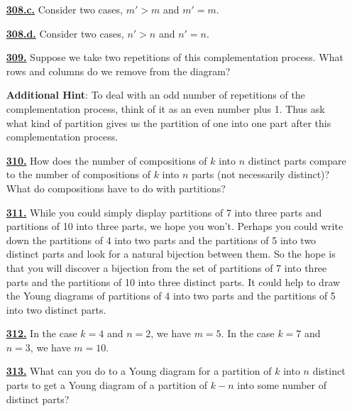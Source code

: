 \documentclass[10pt,]{book}
\theoremstyle{plain}
\theoremstyle{definition}
\theoremstyle{definition}
\theoremstyle{definition}
\numberwithin{equation}{chapter}
\newcommand{\gt}{>}
\begin{document}
\begin{itemize}[itemsep=1em]
\hypertarget{a-308.c}{}\item[\textbf{\hyperref[task-267]{308.c.}}]
\hypertarget{p-1525}{}%
Consider two cases, \(m' \gt m\) and \(m' = m\).%

\hypertarget{a-308.d}{}\item[\textbf{\hyperref[task-268]{308.d.}}]
\hypertarget{p-1528}{}%
Consider two cases, \(n' \gt n\) and \(n' = n\).%

\hypertarget{a-309}{}\item[\textbf{\hyperref[activity-302]{309.}}]
\hypertarget{p-1535}{}%
Suppose we take two repetitions of this complementation process. What rows and columns do we remove from the diagram?%

\par\smallskip
\noindent\textbf{Additional Hint}: \hypertarget{p-1536}{}%
To deal with an odd number of repetitions of the complementation process, think of it as an even number plus 1. Thus ask what kind of partition gives us the partition of one into one part after this complementation process.%

\hypertarget{a-310}{}\item[\textbf{\hyperref[activity-303]{310.}}]
\hypertarget{p-1543}{}%
How does the number of compositions of \(k\) into \(n\) distinct parts compare to the number of compositions of \(k\) into \(n\) parts (not necessarily distinct)? What do compositions have to do with partitions?%

\hypertarget{a-311}{}\item[\textbf{\hyperref[activity-304]{311.}}]
\hypertarget{p-1546}{}%
While you could simply display partitions of 7 into three parts and partitions of 10 into three parts, we hope you won't. Perhaps you could write down the partitions of 4 into two parts and the partitions of 5 into two distinct parts and look for a natural bijection between them. So the hope is that you will discover a bijection from the set of partitions of 7 into three parts and the partitions of 10 into three distinct parts. It could help to draw the Young diagrams of partitions of 4 into two parts and the partitions of 5 into two distinct parts.%

\hypertarget{a-312}{}\item[\textbf{\hyperref[activity-305]{312.}}]
\hypertarget{p-1549}{}%
In the case \(k=4\) and \(n=2\), we have \(m=5\). In the case \(k = 7\) and \(n = 3\), we have \(m = 10\).%

\hypertarget{a-313}{}\item[\textbf{\hyperref[activity-306]{313.}}]
\hypertarget{p-1552}{}%
What can you do to a Young diagram for a partition of \(k\) into \(n\) distinct parts to get a Young diagram of a partition of \(k-n\) into some number of distinct parts?%


\end{itemize}
\end{document}
